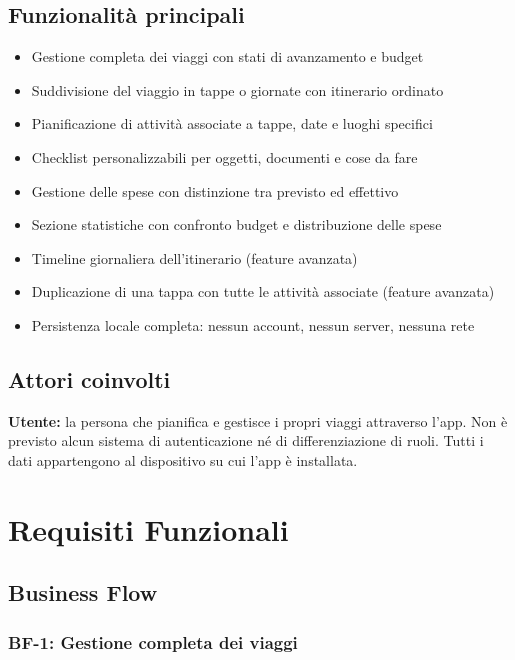 \documentclass[12pt, a4paper]{article}
\begin{document}
\subsection{Funzionalità principali}

\begin{itemize}[leftmargin=1.5em, itemsep=2pt]
  \item Gestione completa dei viaggi con stati di avanzamento e budget
  \item Suddivisione del viaggio in tappe o giornate con itinerario ordinato
  \item Pianificazione di attività associate a tappe, date e luoghi specifici
  \item Checklist personalizzabili per oggetti, documenti e cose da fare
  \item Gestione delle spese con distinzione tra previsto ed effettivo
  \item Sezione statistiche con confronto budget e distribuzione delle spese
  \item Timeline giornaliera dell'itinerario (feature avanzata)
  \item Duplicazione di una tappa con tutte le attività associate (feature avanzata)
  \item Persistenza locale completa: nessun account, nessun server, nessuna rete
\end{itemize}

\subsection{Attori coinvolti}

\textbf{Utente:} la persona che pianifica e gestisce i propri viaggi attraverso l'app.
Non è previsto alcun sistema di autenticazione né di differenziazione di ruoli.
Tutti i dati appartengono al dispositivo su cui l'app è installata.

\section{Requisiti Funzionali}

\subsection{Business Flow}

\subsubsection{BF-1: Gestione completa dei viaggi}
\end{document}
